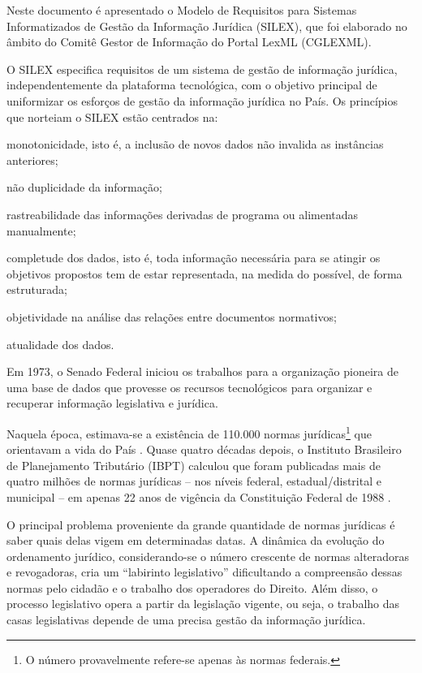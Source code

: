 \documentclass[a4paper,11pt,openright,twoside,brazil]{abntex2}
\begin{document}
Neste documento é apresentado o Modelo de Requisitos para Sistemas 
Informatizados de Gestão da Informação Jurídica (SILEX), que foi elaborado no 
âmbito do Comitê Gestor de Informação do
Portal LexML (CGLEXML).

O SILEX especifica requisitos de um sistema de gestão de informação jurídica,
independentemente da plataforma tecnológica, com o objetivo principal de
uniformizar os esforços de gestão da informação jurídica no País.
Os princípios que norteiam o SILEX estão centrados na:

\begin{alineas}

 \item monotonicidade, isto é, a inclusão de novos dados não invalida as
 instâncias anteriores;
 
 \item não duplicidade da informação;
 
 \item rastreabilidade das informações derivadas de programa ou alimentadas
 manualmente;
 
 \item completude dos dados, isto é, toda informação necessária para se atingir
 os objetivos propostos tem de estar representada, na medida do possível, de
 forma estruturada;
 
 \item objetividade na análise das relações entre documentos normativos;
 
 \item atualidade dos dados.
 
\end{alineas}

Em 1973, o Senado Federal iniciou os trabalhos para a organização pioneira de
uma base de dados que provesse os recursos tecnológicos para organizar e
recuperar informação legislativa e jurídica.

Naquela época, estimava-se a existência de 110.000 normas jurídicas\footnote{O
número provavelmente refere-se apenas às normas federais.} que orientavam a vida
do País \cite{filipi1971}. Quase quatro décadas depois, o Instituto Brasileiro
de Planejamento Tributário (IBPT) calculou que foram publicadas mais de quatro
milhões de normas jurídicas -- nos níveis federal, estadual/distrital e
municipal -- em apenas 22 anos de vigência da Constituição Federal de 1988
\cite{estudo2010}.

O principal problema proveniente da grande quantidade de normas jurídicas é
saber quais delas vigem em determinadas datas. A dinâmica da evolução do
ordenamento jurídico, considerando-se o número crescente de normas alteradoras e
revogadoras, cria um ``labirinto legislativo'' \cite{wald1969} dificultando a
compreensão dessas normas pelo cidadão e o trabalho dos operadores do Direito.
Além disso, o processo legislativo opera a partir da legislação vigente, ou
seja, o trabalho das casas legislativas depende de uma precisa gestão da
informação jurídica.
\end{document}

